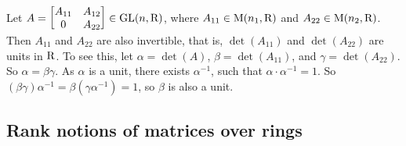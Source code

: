 Let $A=\begin{bmatrix}
	A_{11} & A_{12}\\
	0 & A_{22}
\end{bmatrix}\in\mathrm{GL}(n, \mathrm{R})$, where $A_{11}\in\mathrm{M}(n_1, \mathrm{R})$ and $A_{22}\in\mathrm{M}(n_2, \mathrm{R})$. Then $A_{11}$ and $A_{22}$ are also invertible, that is, $\det(A_{11})$ and $\det(A_{22})$ are units in $\mathrm{R}$. To see this, let $\alpha=\det(A)$, $\beta=\det(A_{11})$, and $\gamma=\det(A_{22})$. So $\alpha=\beta\gamma$. As $\alpha$ is a unit, there exists $\alpha^{-1}$, such that $\alpha\cdot\alpha^{-1}=1$. So $(\beta\gamma)\alpha^{-1}=\beta(\gamma\alpha^{-1})=1$, so $\beta$ is also a unit.


\subsection{Rank notions of matrices over rings}\label{subsec:rank-notion}

